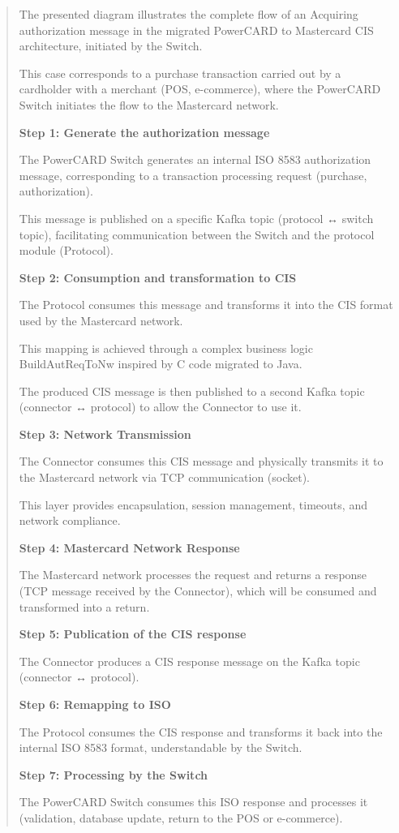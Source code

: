 \documentclass[12pt,a4paper]{report}
\begin{document}
\begin{quote}
The presented diagram illustrates the complete flow of an Acquiring
authorization message in the migrated PowerCARD to Mastercard CIS
architecture, initiated by the Switch.

This case corresponds to a purchase transaction carried out by a
cardholder with a merchant (POS, e-commerce), where the PowerCARD Switch
initiates the flow to the Mastercard network.

\textbf{Step 1: Generate the authorization message}

The PowerCARD Switch generates an internal ISO 8583 authorization
message, corresponding to a transaction processing request (purchase,
authorization).

This message is published on a specific Kafka topic (protocol ↔ switch
topic), facilitating communication between the Switch and the protocol
module (Protocol).

\textbf{Step 2: Consumption and transformation to CIS}

The Protocol consumes this message and transforms it into the CIS format
used by the Mastercard network.

This mapping is achieved through a complex business logic
BuildAutReqToNw inspired by C code migrated to Java.

The produced CIS message is then published to a second Kafka topic
(connector ↔ protocol) to allow the Connector to use it.

\textbf{Step 3: Network Transmission}

The Connector consumes this CIS message and physically transmits it to
the Mastercard network via TCP communication (socket).

This layer provides encapsulation, session management, timeouts, and
network compliance.

\textbf{Step 4: Mastercard Network Response}

The Mastercard network processes the request and returns a response (TCP
message received by the Connector), which will be consumed and
transformed into a return.

\textbf{Step 5: Publication of the CIS response}

The Connector produces a CIS response message on the Kafka topic
(connector ↔ protocol).

\textbf{Step 6: Remapping to ISO}

The Protocol consumes the CIS response and transforms it back into the
internal ISO 8583 format, understandable by the Switch.

\textbf{Step 7: Processing by the Switch}

The PowerCARD Switch consumes this ISO response and processes it
(validation, database update, return to the POS or e-commerce).
\end{quote}
\clearpage
\end{document}
